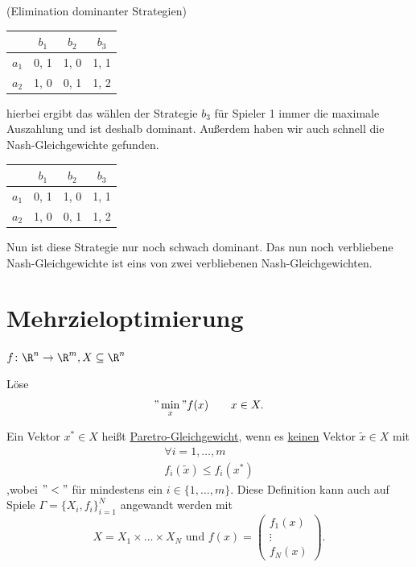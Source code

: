 \begin{beispiel}(Elimination dominanter Strategien)

	\begin{center}
		\begin{tabular}{c|c c c}
			& $b_1$ & $b_2$ & $b_3$ \\ \hline
			$a_1$ & 0, 1 & 1, 0 & 1, 1 \\
			$a_2$ & 1, 0 & 0, 1 & 1, 2
		\end{tabular}
	\end{center}
	hierbei ergibt das wählen der Strategie $b_3$ für Spieler 1 immer die maximale Auszahlung und ist deshalb dominant. Außerdem haben wir auch schnell die Nash-Gleichgewichte gefunden.
	\begin{center}
		\begin{tabular}{c|c c c}
			& $b_1$ & $b_2$ & $b_3$ \\ \hline
			$a_1$ & 0, 1 & 1, 0 & 1, 1 \\
			$a_2$ & 1, 0 & 0, 1 & 1, 2
		\end{tabular}
	\end{center}
	Nun ist diese Strategie nur noch schwach dominant.
	Das nun noch verbliebene Nash-Gleichgewichte ist eins von zwei verbliebenen Nash-Gleichgewichten.
\end{beispiel}

\section{Mehrzieloptimierung}%
\label{sec:Mehrzieloptimierung}

$f \colon \R^{n} \rightarrow \R^{m}, X \subseteq \R^{n}$

Löse
\[
	"\min\limits_{x}" f(x) \qquad \mit x \in X
.\] 

\begin{definition}
	Ein Vektor $x^{*} \in X$ heißt \underline{Paretro-Gleichgewicht}, wenn es \underline{keinen} Vektor $\tilde{x} \in X$ mit
	\begin{align*}
	\forall i=1, \ldots, m \\
	f_{i}(\tilde{x}) \leq f_{i}(x^{*})
	\end{align*}
	,wobei $"<"$ für mindestens ein $ i \in \{1, \ldots, m\}$.
	Diese Definition kann auch auf Spiele $\Gamma = \{X_{i},f_{i}\}_{i=1}^{N}$ angewandt werden mit 
	\[
	X=X_1 \times \ldots \times X_{N} \text{ und }f(x) = \begin{pmatrix}
		f_1(x) \\
		\vdots \\
		f_{N}(x)
	\end{pmatrix}
	.\]
\end{definition}

